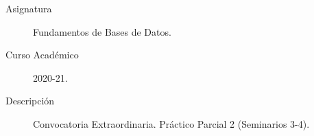 \documentclass[12pt]{article}
\begin{document}

    
    

    \begin{description}
        \item[Asignatura] Fundamentos de Bases de Datos.
        \item[Curso Académico] 2020-21.
        \item[Descripción] Convocatoria Extraordinaria. Práctico Parcial 2 (Seminarios 3-4).
    
    \end{description}
    \newpage
\end{document}
